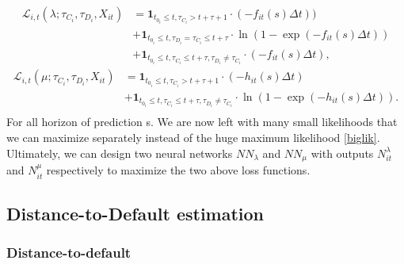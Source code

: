\begin{align}
    \mathcal{L}_{i,t}(\lambda; \tau_{C_i},\tau_{D_i}, X_{it}) &= \textbf{1}_{t_{0_i} \leq t, \tau_{C_i} > t+\tau+1} \cdot (-f_{it}(s)\Delta t)) \\ \nonumber
    &+ \textbf{1}_{t_{0_i} \leq t, \tau_{D_i}=\tau_{C_i} \leq t+\tau}  \cdot \ln(1 - \exp(-f_{it}(s)\Delta t)) \\ \nonumber
    &+ \textbf{1}_{t_{0_i} \leq t, \tau_{C_i} \leq t+\tau, \tau_{D_i} \neq \tau_{C_i}} \cdot (-f_{it}(s)\Delta t),  \nonumber
\end{align}
\begin{align}
    \mathcal{L}_{i,t}(\mu; \tau_{C_i},\tau_{D_i}, X_{it}) &= \textbf{1}_{t_{0_i} \leq t, \tau_{C_i} > t+\tau+1} \cdot (- h_{it}(s)\Delta t) \\ \nonumber
    &+ \textbf{1}_{t_{0_i} \leq t, \tau_{C_i} \leq t+\tau, \tau_{D_i} \neq \tau_{C_i}} \cdot \ln(1-\exp(-h_{it}(s) \Delta t)). \\  \nonumber
\end{align}
For all horizon of prediction s. We are now left with many small likelihoods that we can maximize separately instead of the huge maximum likelihood \ref{biglik}. Ultimately, we can design two neural networks $NN_{\lambda}$ and $NN_{\mu}$ with outputs $N_{it}^{\lambda}$ and $N_{it}^{\mu}$ respectively to maximize the two above loss functions. 

\subsection{Distance-to-Default estimation}
\label{appendix2}


\subsubsection{Distance-to-default}

